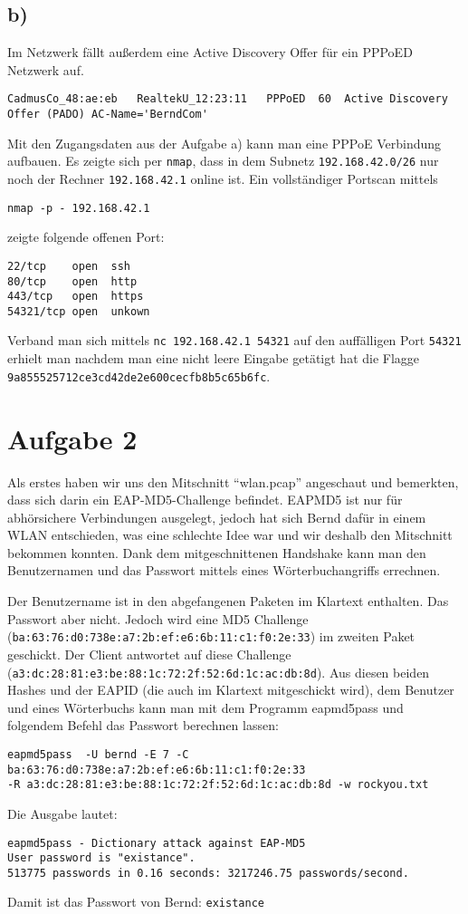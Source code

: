 \documentclass[10pt,a4paper]{article}
\begin{document}
\subsection*{b)}
Im Netzwerk fällt außerdem eine Active Discovery Offer für ein PPPoED Netzwerk auf.
\begin{verbatim}
CadmusCo_48:ae:eb	RealtekU_12:23:11	PPPoED	60	Active Discovery Offer (PADO) AC-Name='BerndCom'
\end{verbatim}
Mit den Zugangsdaten aus der Aufgabe a) kann man eine PPPoE Verbindung aufbauen. 
Es zeigte sich per \texttt{nmap}, dass in dem Subnetz \texttt{192.168.42.0/26} nur noch der Rechner \texttt{192.168.42.1} online ist. Ein vollständiger Portscan mittels
\begin{verbatim}
nmap -p - 192.168.42.1
\end{verbatim} 
zeigte folgende offenen Port:
\begin{verbatim}
22/tcp    open  ssh
80/tcp    open  http
443/tcp   open  https
54321/tcp open  unkown 
\end{verbatim}
Verband man sich mittels \texttt{nc 192.168.42.1 54321} auf den auffälligen Port \texttt{54321} erhielt man nachdem man eine nicht leere Eingabe getätigt hat die Flagge \texttt{9a855525712ce3cd42de2e600cecfb8b5c65b6fc}.

\section*{Aufgabe 2}
Als erstes haben wir uns den Mitschnitt "`wlan.pcap"' angeschaut und bemerkten, dass sich darin ein EAP-MD5-Challenge befindet. EAPMD5 ist nur für abhörsichere Verbindungen ausgelegt, jedoch hat sich Bernd dafür in einem WLAN entschieden, was eine schlechte Idee war und wir deshalb den Mitschnitt bekommen konnten. Dank dem mitgeschnittenen Handshake kann man den Benutzernamen und das Passwort mittels eines Wörterbuchangriffs errechnen.

Der Benutzername ist in den abgefangenen Paketen im Klartext enthalten. Das Passwort aber nicht. Jedoch wird eine MD5 Challenge (\texttt{ba:63:76:d0:738e:a7:2b:ef:e6:6b:11:c1:f0:2e:33}) im zweiten Paket geschickt. Der Client antwortet auf diese Challenge (\texttt{a3:dc:28:81:e3:be:88:1c:72:2f:52:6d:1c:ac:db:8d}). Aus diesen beiden Hashes und der EAPID (die auch im Klartext mitgeschickt wird), dem Benutzer und eines Wörterbuchs kann man mit dem Programm eapmd5pass und folgendem Befehl das Passwort berechnen lassen:
\begin{verbatim}
eapmd5pass  -U bernd -E 7 -C ba:63:76:d0:738e:a7:2b:ef:e6:6b:11:c1:f0:2e:33 
-R a3:dc:28:81:e3:be:88:1c:72:2f:52:6d:1c:ac:db:8d -w rockyou.txt
\end{verbatim}
Die Ausgabe lautet:
\begin{verbatim}
eapmd5pass - Dictionary attack against EAP-MD5
User password is "existance".
513775 passwords in 0.16 seconds: 3217246.75 passwords/second.
\end{verbatim}

Damit ist das Passwort von Bernd: \texttt{existance}
\end{document}
